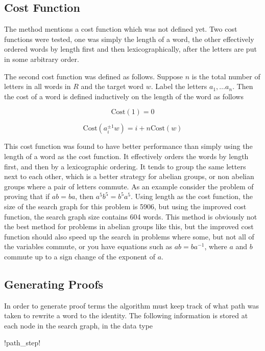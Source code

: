 \documentclass[12pt]{article} %
\theoremstyle{definition}
\theoremstyle{definition}
\theoremstyle{definition}
\theoremstyle{definition}
\begin{document}
\subsection{Cost Function}\label{costfunction}

The method mentions a cost function which was not defined yet. Two cost functions
were tested, one was simply the length of a word, the other effectively ordered words
by length first and then lexicographically, after the letters are put in some arbitrary order.

The second cost function was defined as follows. Suppose $n$ is the total number of
letters in all words in $R$ and the target word $w$.
Label the letters $a_1, \dots a_n$. Then the cost of a word is defined inductively on the
length of the word as follows

\begin{equation}
  \text{Cost}(1) = 0
\end{equation}

\begin{equation}
  \text{Cost}(a_i^{\pm1} w) = i + n \text{Cost}(w)
\end{equation}


This cost function was found to have better performance than simply using the length of a word
as the cost function. It effectively orders the words
by length first, and then by a lexicographic ordering.
It tends to group the same letters next to each other,
which is a better strategy for abelian groups, or non abelian groups where a pair
of letters commute.
As an example consider the problem of proving that
if $ab = ba$, then $a^5b^5=b^5a^5$. Using length as the cost function, the size
of the search graph for this problem is 5906, but using the improved cost function,
the search graph size contains 604 words. This method is obviously not the
best method for problems in abelian groups like this, but the improved cost
function should also speed up the search in problems where some, but not all
of the variables commute, or you have equations such as $ab=ba^{-1}$, where $a$
and $b$ commute up to a sign change of the exponent of $a$.

\subsection{Generating Proofs}
In order to generate proof terms the algorithm must keep track of what path was taken
to rewrite a word to the identity. The following information is stored at each node
in the search graph, in the data type
\begin{lstinline}
  !path_step!
\end{lstinline}
\end{document}
